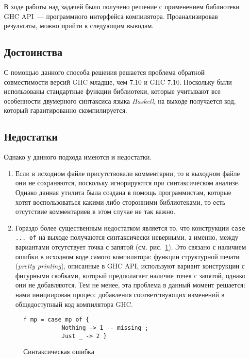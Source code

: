 \Conc
В ходе работы над задачей было получено решение с применением библиотеки GHC API~--- программного интерфейса компилятора. Проанализировав результаты, можно прийти к следующим выводам.
\subsection*{Достоинства}
С помощью данного способа решения решается проблема обратной совместимости версий GHC младше, чем 7.10 и GHC 7.10. Поскольку были использованы стандартные функции библиотеки, которые учитывают все особенности двумерного синтаксиса языка \textit{Haskell}, на выходе получается код, который гарантированно скомпилируется.
\subsection*{Недостатки}
Однако у данного подхода имеются и недостатки.
\begin{enumerate}
\item Если в исходном файле присутствовали комментарии, то в выходном файле они не сохраняются, поскольку игнорируются при синтаксическом анализе. Однако данная утилита была создана в помощь программистам, которые хотят воспользоваться какими-либо сторонними библиотеками, то есть отсутствие комментариев в этом случае не так важно.
\item Гораздо более существенным недостатком является то, что конструкции \lstinline{case ... of} на выходе получаются синтаксически неверными, а именно, между вариантами отсутствует точка с запятой (см. рис.~\ref{error}). Это связано с наличием ошибки в исходном коде самого компилятора: функции структурной печати (\textit{pretty printing}), описанные в GHC API, используют вариант конструкции с фигурными скобками, который предполагает наличие точек с запятой, однако они не добавляются. Тем не менее, эта проблема в данный момент решается: нами инициирован процесс добавления соответствующих изменений в общедоступный код компилятора GHC.
\end{enumerate}

\begin{figure}[h]
    \begin{lstlisting}
f mp = case mp of {
           Nothing -> 1 -- missing ;
           Just _ -> 2 }
    \end{lstlisting}
\caption{Синтаксическая ошибка}\label{error}
\end{figure}

\printbibliography[%
    heading=bibintoc%
]

